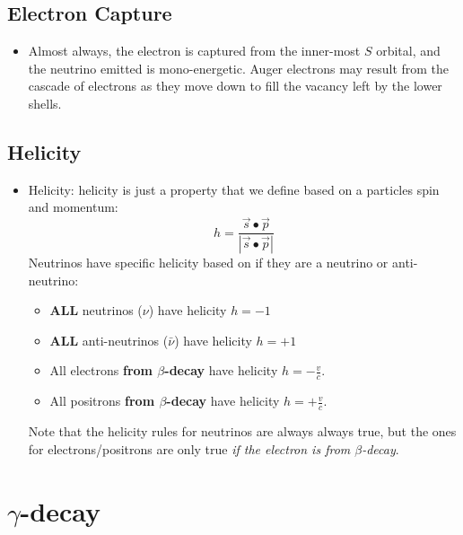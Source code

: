 \documentclass[letter]{article}
\begin{document}
\subsection{Electron Capture}

\begin{itemize}
\item Almost always, the electron is captured from the inner-most $S$
  orbital, and the neutrino emitted is mono-energetic. Auger electrons
  may result from the cascade of electrons as they move down to fill
  the vacancy left by the lower shells.~\cite[Lec. 19-21]{lecture}
\end{itemize}

\subsection{Helicity}

\begin{itemize}
\item Helicity: helicity is just a property that we define based
  on a particles spin and momentum:
  \begin{equation*}
    h=\frac{\vec{s}\bullet\vec{p}}{|\vec{s}\bullet\vec{p}|}
  \end{equation*}
  Neutrinos have specific helicity based on if they are a neutrino or
  anti-neutrino:
  \begin{itemize}
  \item \textbf{ALL} neutrinos ($\nu$) have helicity $h=-1$
  \item \textbf{ALL} anti-neutrinos ($\bar{\nu}$) have helicity $h=+1$
  \item All electrons \textbf{from $\beta$-decay} have helicity
    $h=-\frac{v}{c}$.
  \item All positrons \textbf{from $\beta$-decay} have helicity
    $h=+\frac{v}{c}$.
  \end{itemize}
  Note that the helicity rules for neutrinos are always always true,
  but the ones for electrons/positrons are only true \textit{if the
    electron is from $\beta$-decay}.
\end{itemize}

\section{$\gamma$-decay}
\end{document}

